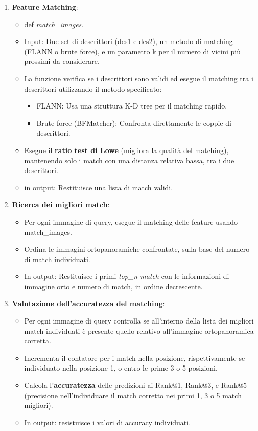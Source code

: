 \documentclass[12pt,a4paper,openright,twoside]{book}
\begin{document}
\begin{enumerate}
\item \textbf{Feature Matching}:
\begin{itemize}
\item def {\itshape match\_images}.
\item Input: Due set di descrittori (des1 e des2), un metodo di matching (FLANN o brute force), e un parametro k per il numero di vicini più prossimi da considerare.
\item La funzione verifica se i descrittori sono validi ed esegue il matching tra i descrittori utilizzando il metodo specificato:
\begin{itemize}
\item FLANN: Usa una struttura K-D tree per il matching rapido.
\item Brute force (BFMatcher): Confronta direttamente le coppie di descrittori.
\end{itemize}
\item Esegue il \textbf{ratio test di Lowe} (migliora la qualità del matching), mantenendo solo i match con una distanza relativa bassa, tra i due descrittori.
\item in output: Restituisce una lista di match validi.
\end{itemize}

\item \textbf{Ricerca dei migliori match}:
\begin{itemize}
\item Per ogni immagine di query, esegue il matching delle feature usando match\_images.
\item Ordina le immagini ortopanoramiche confrontate, sulla base del numero di match individuati.
\item In output: Restituisce i primi {\itshape top\_n match} con le informazioni di immagine orto e numero di match, in ordine decrescente.
\end{itemize}

\item \textbf{Valutazione dell'accuratezza del matching}:
\begin{itemize}
\item Per ogni immagine di query controlla se all'interno della lista dei migliori match individuati è presente quello relativo all'immagine ortopanoramica corretta.
\item Incrementa il contatore per i match nella posizione, rispettivamente se individuato nella posizione 1, o entro le prime 3 o 5 posizioni.
\item Calcola l'\textbf{accuratezza} delle predizioni ai Rank@1, Rank@3, e Rank@5 (precisione nell'individuare il match corretto nei primi 1, 3 o 5 match migliori).
\item In output: resistuisce i valori di accuracy individuati.
\end{itemize}
\end{enumerate}
\end{document}
